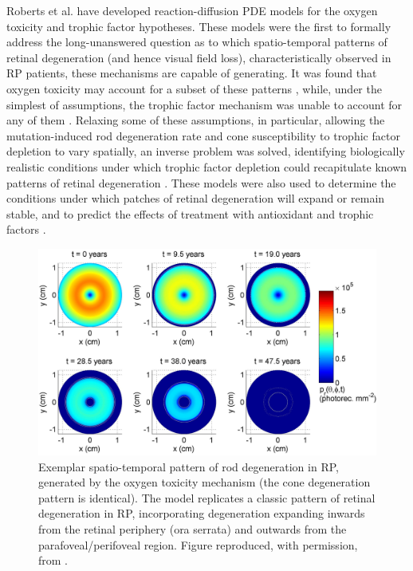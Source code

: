 \documentclass{article}
\begin{document}
Roberts et al. have developed reaction-diffusion PDE models for the oxygen toxicity \citep[1D and 2D,][]{Roberts_et_al_2017,Roberts_et_al_2018a} and trophic factor \citep[1D,][]{Roberts_2022a,Roberts_2022b} hypotheses. These models were the first to formally address the long-unanswered question as to which spatio-temporal patterns of retinal degeneration (and hence visual field loss), characteristically observed in RP patients, these mechanisms are capable of generating. It was found that oxygen toxicity may account for a subset of these patterns \citep[][see Figure \ref{Fig_Roberts2018}]{Roberts_et_al_2017,Roberts_et_al_2018a}, while, under the simplest of assumptions, the trophic factor mechanism was unable to account for any of them \citep{Roberts_2022a}. Relaxing some of these assumptions, in particular, allowing the mutation-induced rod degeneration rate and cone susceptibility to trophic factor depletion to vary spatially, an inverse problem was solved, identifying biologically realistic conditions under which trophic factor depletion could recapitulate known patterns of retinal degeneration \citep{Roberts_2022b}. These models were also used to determine the conditions under which patches of retinal degeneration will expand or remain stable, and to predict the effects of treatment with antioxidant and trophic factors \citep{Roberts_2022a,Roberts_et_al_2017,Roberts_et_al_2018a}.
%
\begin{figure}
\begin{center}
\includegraphics[scale=0.24]{Roberts_et_al_2018_Fig_5_a}
\end{center}
\caption{Exemplar spatio-temporal pattern of rod degeneration in RP, generated by the oxygen toxicity mechanism (the cone degeneration pattern is identical). The model replicates a classic pattern of retinal degeneration in RP, incorporating degeneration expanding inwards from the retinal periphery (ora serrata) and outwards from the parafoveal/perifoveal region. Figure reproduced, with permission, from \citet{Roberts_et_al_2018a}.}
\label{Fig_Roberts2018}
\end{figure}
%
\end{document}
